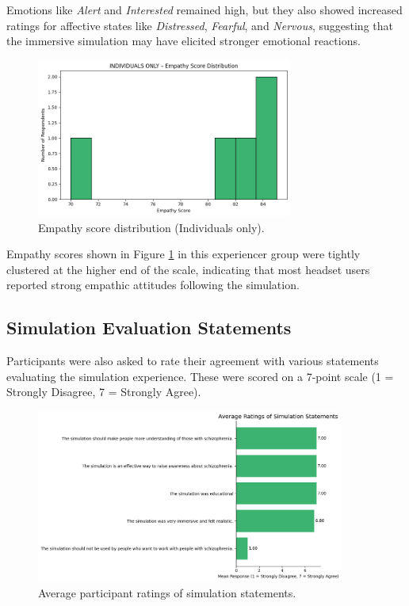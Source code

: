 Emotions like \textit{Alert} and \textit{Interested} remained high, but they also showed increased ratings for affective states like \textit{Distressed}, \textit{Fearful}, and \textit{Nervous}, suggesting that the immersive simulation may have elicited stronger emotional reactions.

\begin{figure}[htbp]
    \centering
    \includegraphics[width=0.75\textwidth]{../../Figures/empathy-score-post-indiv.png}
    \caption{Empathy score distribution (Individuals only).}
    \label{fig:empathy_indiv_post}
\end{figure}

\vspace{1em}

Empathy scores shown in Figure \ref{fig:empathy_indiv_post} in this experiencer group were tightly clustered at the higher end of the scale, indicating that most headset users reported strong empathic attitudes following the simulation.

\subsection{Simulation Evaluation Statements}

Participants were also asked to rate their agreement with various statements evaluating the simulation experience. These were scored on a 7-point scale (1 = Strongly Disagree, 7 = Strongly Agree).

\begin{figure}[H]
    \centering
    \includegraphics[width=0.9\textwidth]{../../Figures/simulation-evaluation-post.png}
    \caption{Average participant ratings of simulation statements.}
    \label{fig:simulation_evaluation_post}
\end{figure}

